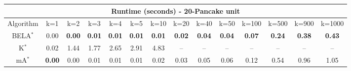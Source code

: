\begin{tabular}{c|ccccccccccccc}\toprule
\multicolumn{14}{c}{Runtime (seconds) - 20-Pancake unit}\\ \midrule
Algorithm & k=1 & k=2 & k=3 & k=4 & k=5 & k=10 & k=20 & k=40 & k=50 & k=100 & k=500 & k=900 & k=1000 \\ \midrule
BELA$^*$ & 0.00 & \textbf{0.00} & \textbf{0.01} & \textbf{0.01} & \textbf{0.01} & \textbf{0.01} & \textbf{0.02} & \textbf{0.04} & \textbf{0.04} & \textbf{0.07} & \textbf{0.24} & \textbf{0.38} & \textbf{0.43} \\
K$^*$ & 0.02 & 1.44 & 1.77 & 2.65 & 2.91 & 4.83 & -- & -- & -- & -- & -- & -- & -- \\
mA$^*$ & \textbf{0.00} & 0.00 & 0.01 & 0.01 & 0.01 & 0.02 & 0.03 & 0.05 & 0.06 & 0.12 & 0.54 & 0.96 & 1.05 \\ \bottomrule 
\end{tabular}
